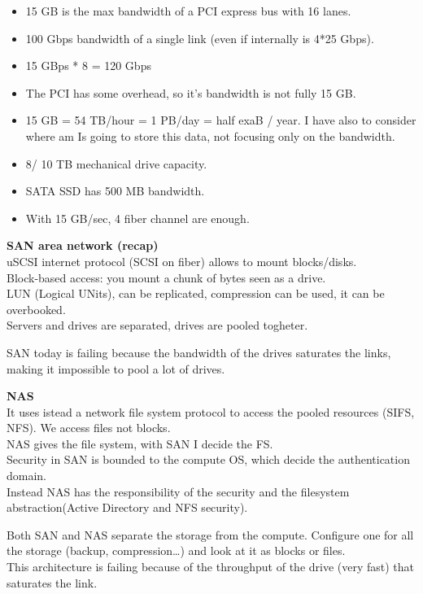 \begin{itemize}
\item
  15 GB is the max bandwidth of a PCI express bus with 16 lanes.
\item
  100 Gbps bandwidth of a single  link (even if internally is 4*25 Gbps).
\item
  15 GBps * 8 = 120 Gbps
\item
  The PCI has some overhead, so it's bandwidth is not fully 15 GB.
\item
  15 GB = 54 TB/hour = 1 PB/day = half exaB / year. I have also to
  consider where am Is going to store this data, not focusing only on
  the bandwidth.
\item
  8/ 10 TB mechanical drive capacity.
\item
  SATA SSD has 500 MB bandwidth.\\
\item
  With 15 GB/sec, 4 fiber channel are enough.
\end{itemize}

\textbf{SAN area network (recap)}\\
uSCSI internet protocol (SCSI on fiber) allows to mount blocks/disks.\\
Block-based access: you mount a chunk of bytes seen as a drive.\\
LUN (Logical UNits), can be replicated, compression can be used, it can
be overbooked.\\
Servers and drives are separated, drives are pooled togheter.

SAN today is failing because the bandwidth of the drives saturates the
links, making it impossible to pool a lot of drives.

\textbf{NAS}\\
It uses istead a network file system protocol to access the pooled
resources (SIFS, NFS). We access files not blocks.\\
NAS gives the file system, with SAN I decide the FS.\\
Security in SAN is bounded to the compute OS, which decide the
authentication domain.\\
Instead NAS has the responsibility of the security and the filesystem
abstraction(Active Directory and NFS security).

Both SAN and NAS separate the storage from the compute. Configure one
for all the storage (backup, compression\ldots) and look at it as blocks
or files.\\
This architecture is failing because of the throughput of the drive
(very fast) that saturates the link.

